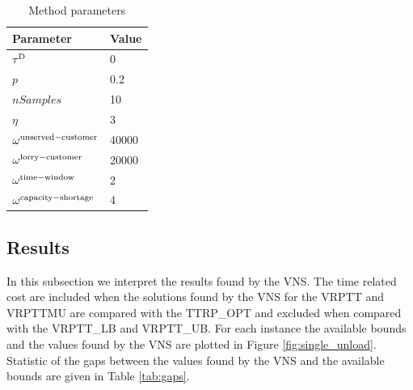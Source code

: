 \begin{table}[ht]
\centering
\caption{Method parameters}
\label{tab:parameters}
\begin{tabular}{ll}
\toprule
Parameter       & Value       \\ \midrule
%
$\tau^{\rm D}$ & 0 \\
$p$   & 0.2    \\
$nSamples $ & 10 \\
$\eta$ & 3 \\
$\omega^{\rm unserved-customer}$ & 40000 \\
$\omega^{\rm lorry-customer}$    & 20000 \\
$\omega^{\rm time-window}$       & 2 \\
$\omega^{\rm capacity-shortage}$ & 4 \\
%
\bottomrule
\end{tabular}
\end{table}

\subsection{Results}


In this subsection we interpret the results found by the VNS.
The time related cost are included when the solutions found by the VNS for the VRPTT and VRPTTMU are compared with the TTRP\_OPT and excluded when compared with the VRPTT\_LB and VRPTT\_UB.
 For each instance the available bounds and the values found by the VNS are plotted in Figure \ref{fig:single_unload}.
Statistic of the gaps between the values found by the VNS and the available bounds are given in Table \ref{tab:gaps}.

